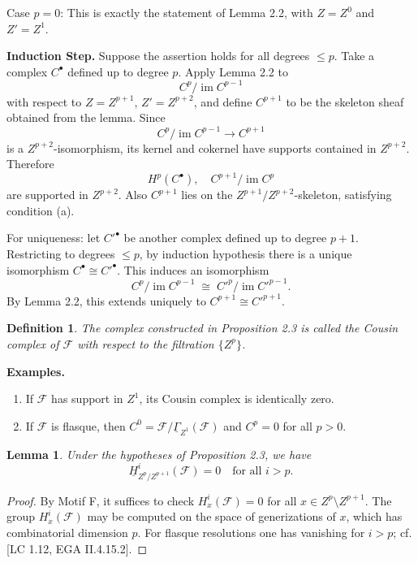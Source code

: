 \documentclass[12pt]{book}
\newcommand{\sheaf}[1]{\mathcal{#1}}
\theoremstyle{plain}
\newtheorem{lemma}{Lemma}[section]
\newtheorem{definition}{Definition}[section]
\begin{document}
\setcounter{page}{234}
Case \(p=0\): This is exactly the statement of Lemma 2.2, with \(Z=Z^0\) and \(Z'=Z^1\).

\medskip
\textbf{Induction Step.}
Suppose the assertion holds for all degrees \(\le p\). Take a complex \(C^\bullet\) defined up to degree \(p\). Apply Lemma 2.2 to
\[
C^p \big/ \operatorname{im}C^{p-1}
\]
with respect to \(Z=Z^{p+1}\), \(Z'=Z^{p+2}\), and define \(C^{p+1}\) to be the skeleton sheaf obtained from the lemma. Since
\[
C^p \big/ \operatorname{im}C^{p-1} \to C^{p+1}
\]
is a \(Z^{p+2}\)-isomorphism, its kernel and cokernel have supports contained in \(Z^{p+2}\). Therefore
\[
H^p(C^\bullet),\quad C^{p+1}\big/\operatorname{im}C^p
\]
are supported in \(Z^{p+2}\). Also \(C^{p+1}\) lies on the \(Z^{p+1}/Z^{p+2}\)-skeleton, satisfying condition (a).

For uniqueness: let \(C'^\bullet\) be another complex defined up to degree \(p+1\). Restricting to degrees \(\le p\), by induction hypothesis there is a unique isomorphism \(C^\bullet\cong C'^\bullet\). This induces an isomorphism
\[
C^p\big/\operatorname{im}C^{p-1} \;\cong\; C'^p\big/\operatorname{im}C'^{p-1}.
\]
By Lemma 2.2, this extends uniquely to \(C^{p+1}\cong C'^{p+1}\).

\setcounter{page}{235}
\begin{definition}
The complex constructed in Proposition 2.3 is called the \textit{Cousin complex} of \(\sheaf{F}\) with respect to the filtration \(\{Z^p\}\).
\end{definition}

\noindent\textbf{Examples.}
\begin{enumerate}
\item If \(\sheaf{F}\) has support in \(Z^1\), its Cousin complex is identically zero.
\item If \(\sheaf{F}\) is flasque, then \(C^0 = \sheaf{F}\big/\underline{\Gamma}_{Z^1}(\sheaf{F})\) and \(C^p=0\) for all \(p>0\).
\end{enumerate}

\begin{lemma}
Under the hypotheses of Proposition 2.3, we have
\[
\underline{H}_{Z^p/Z^{p+1}}^i(\sheaf{F}) = 0 \quad \text{for all } i>p.
\]
\end{lemma}

\begin{proof}
By Motif F, it suffices to check \(H_x^i(\sheaf{F})=0\) for all \(x\in Z^p\setminus Z^{p+1}\). The group \(H_x^i(\sheaf{F})\) may be computed on the space of generizations of \(x\), which has combinatorial dimension \(p\). For flasque resolutions one has vanishing for \(i>p\); cf. [LC 1.12, EGA II.4.15.2].
\end{proof}
\end{document}
